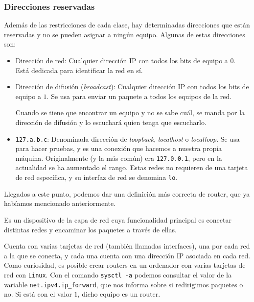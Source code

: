 \subsubsection{Direcciones reservadas}
Además de las restricciones de cada clase, hay determinadas direcciones que están reservadas y no se pueden asignar a ningún equipo. Algunas de estas direcciones son:
\begin{itemize}
    \item Dirección de red: Cualquier dirección IP con todos los bits de equipo a $0$. Está dedicada para identificar la red en sí.
    \item Dirección de difusión (\textit{broadcast}): Cualquier dirección IP con todos los bits de equipo a $1$. Se usa para enviar un paquete a todos los equipos de la red.
    
    Cuando se tiene que encontrar un equipo y no se sabe cuál, se manda por la dirección de difusión y lo escuchará quien tenga que escucharlo.

    \item \verb|127.a.b.c|: Denominada dirección de \textit{loopback}, \textit{localhost} o \textit{localloop}. Se usa para hacer pruebas, y es una conexión que hacemos a nuestra propia máquina. Originalmente (y la más común) era \verb|127.0.0.1|, pero en la actualidad se ha aumentado el rango.
    Estas redes no requieren de una tarjeta de red específica, y su interfaz de red se denomina \verb|lo|.
\end{itemize}

Llegados a este punto, podemos dar una definición más correcta de router, que ya habíamos mencionado anteriormente.
\begin{definicion}[Router]
    Es un dispositivo de la capa de red cuya funcionalidad principal es conectar distintas redes y encaminar los paquetes a través de ellas.
    
    Cuenta con varias tarjetas de red (también llamadas interfaces), una por cada red a la que se conecta, y cada una cuenta con una dirección IP asociada en cada red.\\

    Como curiosidad, es posible crear routers en un ordenador con varias tarjetas de red con \verb|Linux|. Con el comando \verb|sysctl -a| podemos consultar el valor de la variable \verb|net.ipv4.ip_forward|, que nos informa sobre si redirigimos paquetes o no. Si está con el valor $1$, dicho equipo es un router.
\end{definicion}

